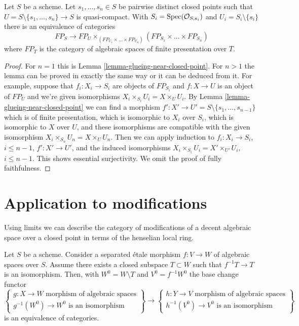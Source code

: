 \begin{lemma}
\label{lemma-glueing-near-multiple-closed-points}
Let $S$ be a scheme. Let $s_1, \ldots, s_n \in S$ be
pairwise distinct closed points such that
$U = S \setminus \{s_1, \ldots, s_n\} \to S$ is quasi-compact. With
$S_i = \mathop{\mathrm{Spec}}(\mathcal{O}_{S, s_i})$ and $U_i = S_i \setminus \{s_i\}$
there is an equivalence of categories
$$
FP_S \longrightarrow
FP_U \times_{(FP_{U_1} \times \ldots \times FP_{U_n})}
(FP_{S_1} \times \ldots \times FP_{S_n})
$$
where $FP_T$ is the category of algebraic spaces of finite presentation
over $T$.
\end{lemma}

\begin{proof}
For $n = 1$ this is Lemma \ref{lemma-glueing-near-closed-point}.
For $n > 1$ the lemma can be proved in exactly the same way or it
can be deduced from it. For example, suppose that $f_i : X_i \to S_i$
are objects of $FP_{S_i}$ and $f : X \to U$ is an object
of $FP_U$ and we're given isomorphisms $X_i \times_{S_i} U_i = X \times_U U_i$.
By Lemma \ref{lemma-glueing-near-closed-point} we can find
a morphism $f' : X' \to U' = S \setminus \{s_1, \ldots, s_{n - 1}\}$
which is of finite presentation, which is isomorphic to
$X_i$ over $S_i$, which is isomorphic to $X$ over $U$, and
these isomorphisms are compatible with the given isomorphism
$X_i \times_{S_n} U_n = X \times_U U_n$.
Then we can apply induction to
$f_i : X_i \to S_i$, $i \leq n - 1$,
$f' : X' \to U'$, and the induced
isomorphisms $X_i \times_{S_i} U_i = X' \times_{U'} U_i$, $i \leq n - 1$.
This shows essential surjectivity. We omit the proof of
fully faithfulness.
\end{proof}







\section{Application to modifications}
\label{section-modifications-at-a-point}

\noindent
Using limits we can describe the category of modifications of
a decent algebraic space over a closed point in terms of the
henselian local ring.

\begin{lemma}
\label{lemma-excision-modifications}
Let $S$ be a scheme. Consider a separated \'etale morphism
$f : V \to W$ of algebraic spaces over $S$.
Assume there exists a
closed subspace $T \subset W$ such that $f^{-1}T \to T$ is
an isomorphism. Then, with $W^0 = W \setminus T$ and
$V^0 = f^{-1}W^0$ the base change functor
$$
\left\{
\begin{matrix}
g : X \to W\text{ morphism of algebraic spaces} \\
g^{-1}(W^0) \to W^0\text{ is an isomorphism}
\end{matrix}
\right\}
\longrightarrow
\left\{
\begin{matrix}
h : Y \to V\text{ morphism of algebraic spaces} \\
h^{-1}(V^0) \to V^0\text{ is an isomorphism}
\end{matrix}
\right\}
$$
is an equivalence of categories.
\end{lemma}

